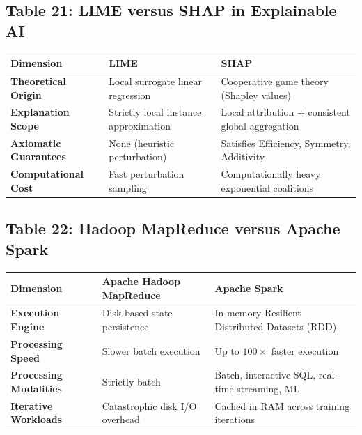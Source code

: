 \subsection*{Table 21: LIME versus SHAP in Explainable AI}
\begin{center}
\small
\begin{tabularx}{\textwidth}{lXX}
\toprule
\textbf{Dimension} & \textbf{LIME} & \textbf{SHAP} \\
\midrule
\textbf{Theoretical Origin} & Local surrogate linear regression & Cooperative game theory (Shapley values) \\
\textbf{Explanation Scope} & Strictly local instance approximation & Local attribution + consistent global aggregation \\
\textbf{Axiomatic Guarantees} & None (heuristic perturbation) & Satisfies Efficiency, Symmetry, Additivity \\
\textbf{Computational Cost} & Fast perturbation sampling & Computationally heavy exponential coalitions \\
\bottomrule
\end{tabularx}
\end{center}

\subsection*{Table 22: Hadoop MapReduce versus Apache Spark}
\begin{center}
\small
\begin{tabularx}{\textwidth}{lXX}
\toprule
\textbf{Dimension} & \textbf{Apache Hadoop MapReduce} & \textbf{Apache Spark} \\
\midrule
\textbf{Execution Engine} & Disk-based state persistence & In-memory Resilient Distributed Datasets (RDD) \\
\textbf{Processing Speed} & Slower batch execution & Up to $100\times$ faster execution \\
\textbf{Processing Modalities} & Strictly batch & Batch, interactive SQL, real-time streaming, ML \\
\textbf{Iterative Workloads} & Catastrophic disk I/O overhead & Cached in RAM across training iterations \\
\bottomrule
\end{tabularx}
\end{center}

